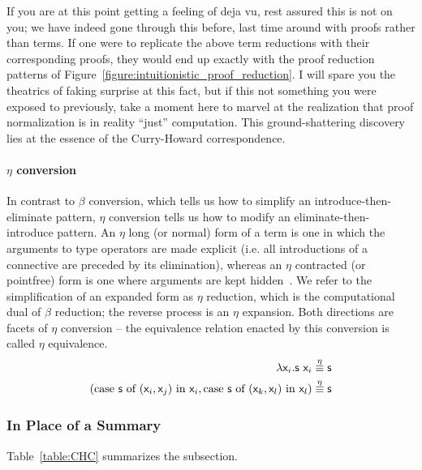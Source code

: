 If you are at this point getting a feeling of deja vu, rest assured this is not on you; we have indeed gone through this before, last time around with proofs rather than terms.
If one were to replicate the above term reductions with their corresponding proofs, they would end up exactly with the proof reduction patterns of Figure~\ref{figure:intuitionistic_proof_reduction}.
I will spare you the theatrics of faking surprise at this fact, but if this not something you were exposed to previously, take a moment here to marvel at the realization that proof normalization is in reality ``just'' computation.
This ground-shattering discovery lies at the essence of the Curry-Howard correspondence.

\paragraph{$\eta$ conversion}
In contrast to $\beta$ conversion, which tells us how to simplify an introduce-then-eliminate pattern, $\eta$ conversion tells us how to modify an eliminate-then-introduce pattern.
An $\eta$ long (or normal) form of a term is one in which the arguments to type operators are made explicit (i.e. all introductions of a connective are preceded by its elimination), whereas an $\eta$ contracted (or pointfree) form is one where arguments are kept hidden~\cite{prawitz1965proof}.
We refer to the simplification of an expanded form as $\eta$ reduction, which is the computational dual of $\beta$ reduction; 
the reverse process is an $\eta$ expansion.
Both directions are facets of $\eta$ conversion -- the equivalence relation enacted by this conversion is called $\eta$ equivalence.
\begin{align}
	\mathsf{\mathnormal{\lambda} \mathsf{x}_{\mathnormal{i}} .s~\mathsf{x}_{\mathnormal{i}} } & \overset{\eta}{\equiv} \mathsf{s}\\
	(\textrm{case \ensuremath{\mathsf{s}} of \ensuremath{\mathsf{(\mathsf{x}_{\mathnormal{i}}, \mathsf{x}_{\mathnormal{j}})}} in \ensuremath{\mathsf{\mathsf{x}_{\mathnormal{i}}}}}, \textrm{case \ensuremath{\mathsf{s}} of \ensuremath{\mathsf{(\mathsf{x}_{\mathnormal{k}},\mathsf{x}_{\mathnormal{l}})}} in \ensuremath{\mathsf{\mathsf{x}_{\mathnormal{l}}}}}) & \overset{\eta}{\equiv} \mathsf{s}
\end{align}


\subsubsection{In Place of a Summary}
Table~\ref{table:CHC} summarizes the subsection.


